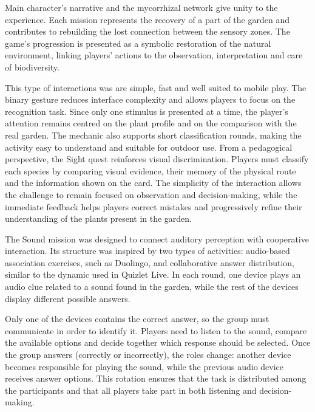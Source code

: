 Main character’s narrative and the mycorrhizal network give unity to the experience. Each mission represents the recovery of a part of the garden and contributes to rebuilding the lost connection between the sensory zones. The game’s progression is presented as a symbolic restoration of the natural environment, linking players’ actions to the observation, interpretation and care of biodiversity.





 This type of interactions was are simple, fast and well suited to mobile play. The binary gesture reduces interface complexity and allows players to focus on the recognition task. Since only one stimulus is presented at a time, the player’s attention remains centred on the plant profile and on the comparison with the real garden. The mechanic also supports short classification rounds, making the activity easy to understand and suitable for outdoor use. 
From a pedagogical perspective, the Sight quest reinforces visual discrimination. Players must classify each species by comparing visual evidence, their memory of the physical route and the information shown on the card. The simplicity of the interaction allows the challenge to remain focused on observation and decision-making, while the immediate feedback helps players correct mistakes and progressively refine their understanding of the plants present in the garden.

The Sound mission was designed to connect auditory perception with cooperative interaction. Its structure was inspired by two types of activities: audio-based association exercises, such as Duolingo, and collaborative answer distribution, similar to the dynamic used in Quizlet Live. In each round, one device plays an audio clue related to a sound found in the garden, while the rest of the devices display different possible answers.

Only one of the devices contains the correct answer, so the group must communicate in order to identify it. Players need to listen to the sound, compare the available options and decide together which response should be selected. Once the group answers (correctly or incorrectly), the roles change: another device becomes responsible for playing the sound, while the previous audio device receives answer options. This rotation ensures that the task is distributed among the participants and that all players take part in both listening and decision-making.

